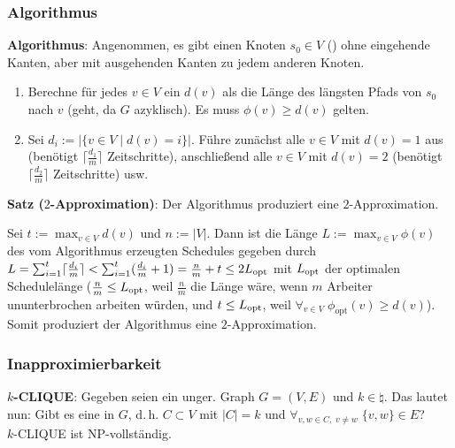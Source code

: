 \subsubsection{%
    Algorithmus%
}

\textbf{Algorithmus}:
Angenommen, es gibt einen Knoten $s_0 \in V$ ()
ohne eingehende Kanten, aber mit ausgehenden Kanten zu jedem anderen Knoten.
\begin{enumerate}
    \item
    Berechne für jedes $v \in V$ ein  $d(v)$ als
    die Länge des längsten Pfads von $s_0$ nach $v$ (geht, da $G$ azyklisch).
    Es muss $\phi(v) \ge d(v)$ gelten.

    \item
    Sei $d_i := |\{v \in V \;|\; d(v) = i\}|$.
    Führe zunächst alle $v \in V$ mit $d(v) = 1$ aus
    (benötigt $\lceil\frac{d_1}{m}\rceil$ Zeitschritte),
    anschließend alle $v \in V$ mit $d(v) = 2$
    (benötigt $\lceil\frac{d_2}{m}\rceil$ Zeitschritte) usw.
\end{enumerate}

\textbf{Satz ($2$-Approximation)}:
Der Algorithmus produziert eine $2$-Approximation.

\begin{Beweis}
    Sei $t := \max_{v \in V} d(v)$ und $n := |V|$.
    Dann ist die Länge $L := \max_{v \in V} \phi(v)$ des
    vom Algorithmus erzeugten Schedules gegeben durch
    $L
    = \sum_{i=1}^t \lceil\frac{d_i}{m}\rceil
    < \sum_{i=1}^t (\frac{d_i}{m} + 1)
    = \frac{n}{m} + t
    \le 2L_{\text{opt}}$
    mit $L_{\text{opt}}$ der optimalen Schedulelänge
    ($\frac{n}{m} \le L_{\text{opt}}$, weil $\frac{n}{m}$ die Länge wäre,
    wenn $m$ Arbeiter ununterbrochen arbeiten würden, und
    $t \le L_{\text{opt}}$, weil $\forall_{v \in V}\; \phi_{\text{opt}}(v) \ge d(v)$).
    Somit produziert der Algorithmus eine $2$-Approximation.
\end{Beweis}

\pagebreak

\subsubsection{%
    Inapproximierbarkeit%
}

\textbf{$k$-CLIQUE}:
Gegeben seien ein unger. Graph $G = (V, E)$ und $k \in \natural$.
Das  lautet nun:
Gibt es eine  in $G$, d.\,h. $C \subset V$ mit $|C| = k$ und
$\forall_{v, w \in C,\; v \not= w}\; \{v, w\} \in E$?\\
$k$-CLIQUE ist NP-vollständig.

